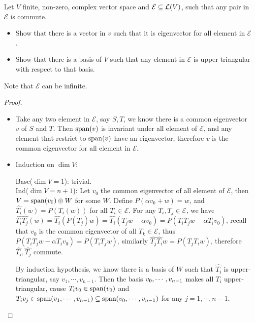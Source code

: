 \documentclass[../main.tex]{subfiles}
\begin{document}
\setcounter{exercise}{8}
\begin{exercise}
  Let $V$ finite, non-zero, complex vector space and $\mathcal{E} \subseteq \mathcal{L}(V)$,
  such that any pair in $\mathcal{E}$ is commute.
  \begin{itemize}
    \item Show that there is a vector in $v$ such that it is eigenvector for all element in $\mathcal{E}$.
    \item Show that there is a basis of $V$ such that any element in $\mathcal{E}$ is upper-triangular with respect to that basis.
  \end{itemize}

  Note that $\mathcal{E}$ can be infinite.
\end{exercise}
\begin{proof}
  ~
  \begin{itemize}
    \item Take any two element in $\mathcal{E}$, say $S, T$, we know there is a common eigenvector $v$ of $S$ and $T$.
          Then $\operatorname{span}(v)$ is invariant under all element of $\mathcal{E}$, and
          any element that restrict to $\operatorname{span}(v)$ have an eigenvector, therefore
          $v$ is the common eigenvector for all element in $\mathcal{E}$.
    \item Induction on $\dim V$:
    
          Base($\dim V = 1$): trivial. \\
          Ind($\dim V = n + 1$): Let $v_0$ the common eigenvector of all element of $\mathcal{E}$,
          then $V = \operatorname{span}(v_0) \oplus W$ for some $W$.
          Define $P(\alpha v_0 + w) = w$, and $\hat{T_i}(w) = P(T_i(w))$ for all
          $T_i \in \mathcal{E}$.
          For any $T_i, T_j \in \mathcal{E}$, we have
          $\hat{T_i}\hat{T_j}(w) = \hat{T_i}(P(T_j)w) = \hat{T_i}(T_jw - \alpha v_0) = P(T_iT_jw - \alpha T_i v_0)$,
          recall that $v_0$ is the common eigenvector of all $T_k \in \mathcal{E}$,
          thus $P(T_iT_jw - \alpha T_i v_0) = P(T_iT_jw)$,
          similarly $\hat{T_j}\hat{T_i}w = P(T_jT_iw)$, therefore $\hat{T_i}, \hat{T_j}$ commute.

          By induction hypothesis, we know there is a basis of $W$ such
          that $\hat{T_i}$ is upper-triangular, say $v_1, \cdots, v_{n - 1}$.
          Then the basis $v_0 , \cdots , v_{n - 1}$ makes all $T_i$ upper-triangular,
          cause $T_iv_0 \in \operatorname{span}(v_0)$ and $T_iv_j \in \operatorname{span}(v_1, \cdots, v_{n - 1}) \subseteq \operatorname{span}(v_0 , \cdots , v_{n - 1})$ for any $j = 1, \cdots, n - 1$.
  \end{itemize}
\end{proof}
\end{document}
